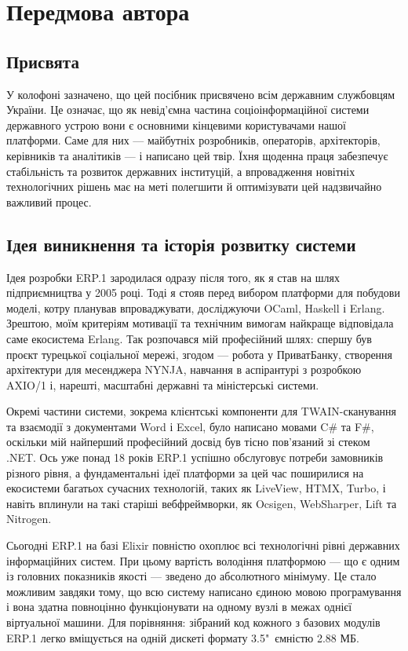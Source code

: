 \chapter*{Передмова автора}

\section*{Присвята}

У колофоні зазначено, що цей посібник присвячено всім державним службовцям України. Це означає, що як невід'ємна частина соціоінформаційної системи державного устрою вони є основними кінцевими користувачами нашої платформи. Саме для них — майбутніх розробників, операторів, архітекторів, керівників та аналітиків — і написано цей твір. Їхня щоденна праця забезпечує стабільність та розвиток державних інституцій, а впровадження новітніх технологічних рішень має на меті полегшити й оптимізувати цей надзвичайно важливий процес.

\section*{Ідея виникнення та історія розвитку системи}

Ідея розробки ERP.1 зародилася одразу після того, як я став на шлях підприємництва у 2005 році. Тоді я стояв перед вибором платформи для побудови моделі, котру планував впроваджувати, досліджуючи OCaml, Haskell і Erlang. Зрештою, моїм критеріям мотивації та технічним вимогам найкраще відповідала саме екосистема Erlang. Так розпочався мій професійний шлях: спершу був проєкт турецької соціальної мережі, згодом — робота у ПриватБанку, створення архітектури для месенджера NYNJA, навчання в аспірантурі з розробкою AXIO/1 і, нарешті, масштабні державні та міністерські системи.

Окремі частини системи, зокрема клієнтські компоненти для TWAIN-сканування та взаємодії з документами Word і Excel, було написано мовами C\# та F\#, оскільки мій найперший професійний досвід був тісно пов'язаний зі стеком .NET. Ось уже понад 18 років ERP.1 успішно обслуговує потреби замовників різного рівня, а фундаментальні ідеї платформи за цей час поширилися на екосистеми багатьох сучасних технологій, таких як LiveView, HTMX, Turbo, і навіть вплинули на такі старіші вебфреймворки, як Ocsigen, WebSharper, Lift та Nitrogen.

Сьогодні ERP.1 на базі Elixir повністю охоплює всі технологічні рівні державних інформаційних систем. При цьому вартість володіння платформою — що є одним із головних показників якості — зведено до абсолютного мінімуму. Це стало можливим завдяки тому, що всю систему написано єдиною мовою програмування і вона здатна повноцінно функціонувати на одному вузлі в межах однієї віртуальної машини. Для порівняння: зібраний код кожного з базових модулів ERP.1 легко вміщується на одній дискеті формату 3.5"\ ємністю 2.88 МБ.

